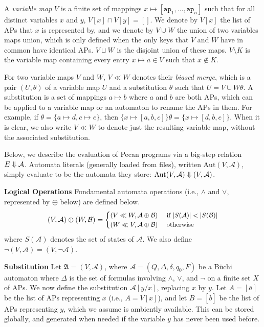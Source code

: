 A \emph{variable map} $V$ is a finite set of mappings $x \mapsto [\texttt{ap}_1, \ldots, \texttt{ap}_n]$ such that for all distinct variables $x$ and $y$, $V[x] \cap V[y] = []$.
We denote by $V[x]$ the list of APs that $x$ is represented by, and we denote by $V \cup W$ the union of two variables maps union, which is only defined when the only keys that $V$ and $W$ have in common have identical APs.
$V \sqcup W$ is the disjoint union of these maps.
$V \setminus K$ is the variable map containing every entry $x \mapsto a \in V$ such that $x \not\in K$.

For two variable maps $V$ and $W$, $V \ll W$ denotes their \emph{biased merge}, which is a pair $(U, \theta)$ of a variable map $U$ and a substitution $\theta$ such that $U = V \cup W\theta$.
A substitution is a set of mappings $a \mapsto b$ where $a$ and $b$ are both APs, which can be applied to a variable map or an automaton to rename the APs in them.
For example, if $\theta = \{ a \mapsto d, c \mapsto e \}$, then $\{ x \mapsto [ a, b, c ] \} \theta = \{ x \mapsto [ d, b, e ] \}$.
When it is clear, we also write $V \ll W$ to denote just the resulting variable map, without the associated substitution.

Below, we describe the evaluation of Pecan programs via a big-step relation $E \Downarrow \mathcal{A}$.
Automata literals (generally loaded from files), written $\text{Aut}(V, \mathcal{A})$, simply evaluate to be the automata they store: $\text{Aut}(V, \mathcal{A}) \Downarrow (V, \mathcal{A})$.

\textbf{Logical Operations}
Fundamental automata operations (i.e., $\land$ and $\lor$, represented by $\oplus$ below) are defined below.
\[
\small
    (V, \mathcal{A}) \oplus (W, \mathcal{B}) = 
    \begin{cases}
        (V \ll W, \mathcal{A} \oplus \mathcal{B}) & \tif |S(\mathcal{A})| < |S(\mathcal{B})| \\
        (W \ll V, \mathcal{A} \oplus \mathcal{B}) & \owise
    \end{cases}
\]
where $S(\mathcal{A})$ denotes the set of states of $\mathcal{A}$.
We also define $\lnot (V, \mathcal{A}) = (V, \lnot \mathcal{A})$.

\textbf{Substitution}
Let $\mathfrak{A} = (V, \mathcal{A})$, where $\mathcal{A} = (Q, \Delta, \delta, q_0, F)$ be a B\"uchi automaton where $\Delta$ is the set of formulas involving $\land$, $\lor$, and $\lnot$ on a finite set $X$ of APs.
We now define the substitution $\mathcal{A}[y/x]$, replacing $x$ by $y$.
Let $A = [\overline{a}]$ be the list of APs representing $x$ (i.e., $A = V[x]$), and let $B = [\overline{b}]$ be the list of APs representing $y$, which we assume is ambiently available.
This can be stored globally, and generated when needed if the variable $y$ has never been used before.

